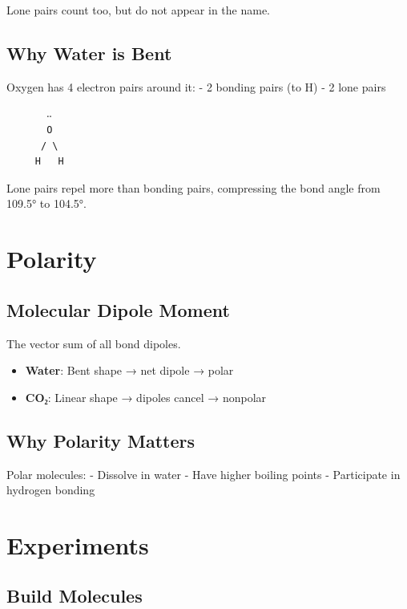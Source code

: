 \documentclass[
  11pt,
  letterpaper,
  twoside,
  openright]{book}
\providecommand{\tightlist}{%
  \setlength{\itemsep}{0pt}\setlength{\parskip}{0pt}}
\begin{document}
Lone pairs count too, but do not appear in the name.

\subsection{Why Water is Bent}\label{why-water-is-bent}

Oxygen has 4 electron pairs around it: - 2 bonding pairs (to H) - 2 lone
pairs

\begin{verbatim}
       ‥
       O
      / \
     H   H
\end{verbatim}

Lone pairs repel more than bonding pairs, compressing the bond angle
from 109.5° to 104.5°.

\section{Polarity}\label{polarity}

\subsection{Molecular Dipole Moment}\label{molecular-dipole-moment}

The vector sum of all bond dipoles.

\begin{itemize}
\tightlist
\item
  \textbf{Water}: Bent shape → net dipole → polar
\item
  \textbf{CO₂}: Linear shape → dipoles cancel → nonpolar
\end{itemize}

\subsection{Why Polarity Matters}\label{why-polarity-matters}

Polar molecules: - Dissolve in water - Have higher boiling points -
Participate in hydrogen bonding

\section{Experiments}\label{experiments-5}

\subsection{Build Molecules}\label{build-molecules}
\end{document}
